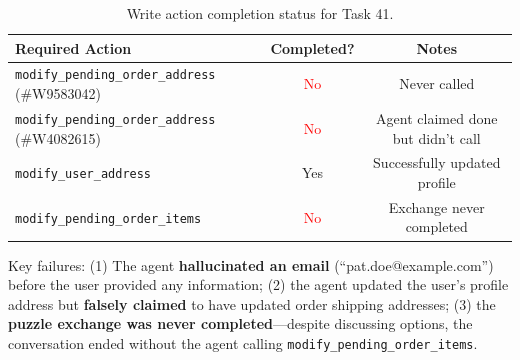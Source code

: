 \begin{table}[h]
\centering
\small
\begin{tabular}{lcc}
\toprule
\textbf{Required Action} & \textbf{Completed?} & \textbf{Notes} \\
\midrule
\texttt{modify\_pending\_order\_address} (\#W9583042) & \textcolor{red}{No} & Never called \\
\texttt{modify\_pending\_order\_address} (\#W4082615) & \textcolor{red}{No} & Agent claimed done but didn't call \\
\texttt{modify\_user\_address} & \textcolor{green!60!black}{Yes} & Successfully updated profile \\
\texttt{modify\_pending\_order\_items} & \textcolor{red}{No} & Exchange never completed \\
\bottomrule
\end{tabular}
\caption{Write action completion status for Task 41.}
\label{tab:task41-completion}
\end{table}

Key failures: (1) The agent \textbf{hallucinated an email} (``pat.doe@example.com'') before the user provided any information; (2) the agent updated the user's profile address but \textbf{falsely claimed} to have updated order shipping addresses; (3) the \textbf{puzzle exchange was never completed}---despite discussing options, the conversation ended without the agent calling \texttt{modify\_pending\_order\_items}.
